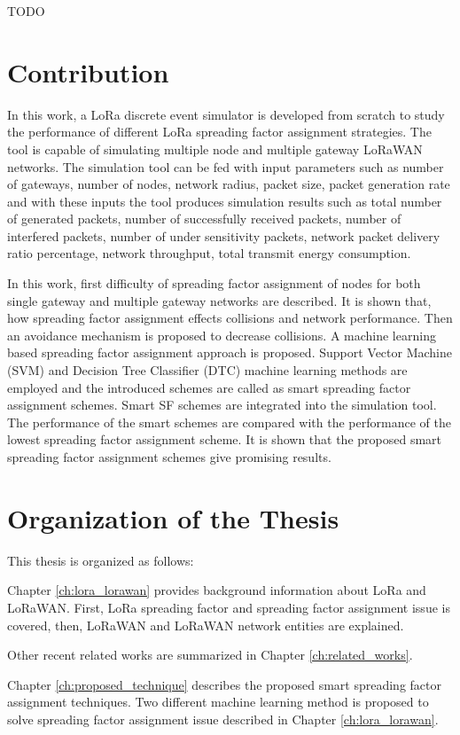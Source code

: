 TODO \cite{8030482}

\section{Contribution}
In this work, a LoRa discrete event simulator is developed from scratch to study the performance of different LoRa spreading factor assignment strategies. The tool is capable of simulating multiple node and multiple gateway LoRaWAN networks. The simulation tool can be fed with input parameters such as number of gateways, number of nodes, network radius, packet size, packet generation rate and with these inputs the tool produces simulation results such as total number of generated packets, number of successfully received packets, number of interfered packets, number of under sensitivity packets, network packet delivery ratio percentage, network throughput, total transmit energy consumption. 

In this work, first difficulty of spreading factor assignment of nodes for both single gateway and multiple gateway networks are described. It is shown that, how spreading factor assignment effects collisions and network performance. Then an avoidance mechanism is proposed to decrease collisions. A machine learning based spreading factor assignment approach is proposed. Support Vector Machine (SVM) and Decision Tree Classifier (DTC) machine learning methods are employed and the introduced schemes are called as smart spreading factor assignment schemes. Smart SF schemes are integrated into the simulation tool. The performance of the smart schemes are compared with the performance of the lowest spreading factor assignment scheme. It is shown that the proposed smart spreading factor assignment schemes give promising results.

\section{Organization of the Thesis}
This thesis is organized as follows:

Chapter \ref{ch:lora_lorawan} provides background information about LoRa and LoRaWAN. First, LoRa spreading factor and spreading factor assignment issue is covered, then, LoRaWAN and LoRaWAN network entities are explained.

Other recent related works are summarized in Chapter \ref{ch:related_works}.

Chapter \ref{ch:proposed_technique} describes the proposed smart spreading factor assignment techniques. Two different machine learning method is proposed to solve spreading factor assignment issue described in Chapter \ref{ch:lora_lorawan}.

